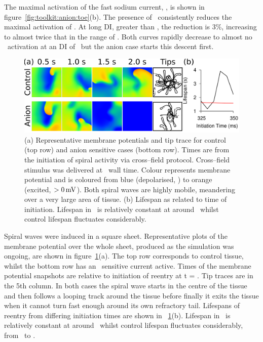 The maximal activation of the fast sodium current, , is shown in
figure~\ref{fig:toolkit:anion:toe}(b).
The presence of \ consistently reduces the maximal activation of .
At long DI, greater than , the reduction is 3\%, increasing to almost
twice that in the range of .
Both curves rapidly decrease to almost no \ activation at an DI of
\ but the anion case starts this descent first.


\begin{figure}
\begin{center}
\includegraphics{figures/toolkit/anion/twod_traces}
\end{center}
\caption[Anion Sensitive Tissue Sheets and Spiral Lifespands]{
\label{fig:toolkit:anion:spiral}
(a)
Representative membrane potentials and tip trace for control (top row) and anion
sensitive cases (bottom row).
Times are from the initiation of spiral activity via cross--field protocol.
Cross--field stimulus was delivered at \ wall time.
Colour represents membrane potential and is coloured from blue (depolarised,
) to orange (excited, $>0\,\text{mV}$).
Both spiral waves are highly mobile, meandering over a very large area of
tissue.
(b)
Lifespan as related to time of initiation.
Lifespan in \ is relatively constant at around \ whilst
control lifespan fluctuates considerably.
}
\end{figure}

Spiral waves were induced in a square sheet.
Representative plots of the
membrane potential over the whole sheet, produced as the simulation was ongoing,
are shown in figure~\ref{fig:toolkit:anion:spiral}(a).
The top row corresponds to control tissue, whilst the bottom row has an
\ sensitive current active.
Times of the membrane potential snapshots are relative to initiation of reentry at t = .
Tip traces are in the 5th column.
In both cases the spiral wave starts in the centre of the tissue and then follows a
looping track around the tissue before finally it exits the tissue when it
cannot turn fast enough around its own refractory tail.
Lifespans of reentry from differing initiation times are shown in
~\ref{fig:toolkit:anion:spiral}(b).
Lifespan in \ is relatively constant at around \ whilst
control lifespan fluctuates considerably, from \ to .

